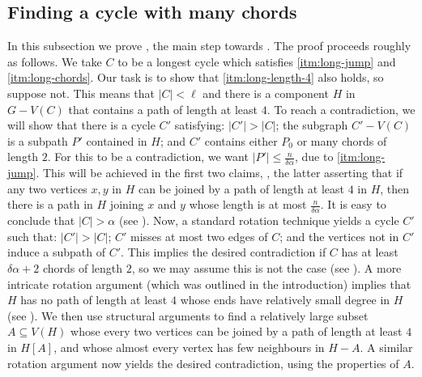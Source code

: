 \documentclass[11pt,english]{article}
\theoremstyle{plain}
\theoremstyle{definition}
\theoremstyle{remark}
\renewcommand{\setminus}{-}
\begin{document}
	\subsection{Finding a cycle with many chords}
		In this subsection we prove , the main step towards . 
		The proof proceeds roughly as follows. We take $C$ to be a longest cycle which satisfies \ref{itm:long-jump} and \ref{itm:long-chords}. Our task is to show that \ref{itm:long-length-4} also holds, so suppose not. This means that $|C| < \ell$ and there is a component $H$ in $G - V(C)$ that contains a path of length at least $4$. To reach a contradiction, we will show that there is a cycle $C'$ satisfying: $|C'| > |C|$; the subgraph $C' \setminus V(C)$ is a subpath $P'$ contained in $H$; and $C'$ contains either $P_0$ or many chords of length $2$. For this to be a contradiction, we want $|P'| \le \frac{n}{\delta \alpha}$, due to \ref{itm:long-jump}. This will be achieved in the first two claims, , the latter asserting that if any two vertices $x,y$ in $H$ can be joined by a path of length at least $4$ in $H$, then there is a path in $H$ joining $x$ and $y$ whose length is at most $\frac{n}{\delta \alpha}$. It is easy to conclude that $|C| > \alpha$ (see ). Now, a standard rotation technique yields a cycle $C'$ such that: $|C'| > |C|$; $C'$ misses at most two edges of $C$; and the vertices not in $C'$ induce a subpath of $C'$. This implies the desired contradiction if $C$ has at least $\delta \alpha + 2$ chords of length $2$, so we may assume this is not the case (see ). A more intricate rotation argument (which was outlined in the introduction) implies that $H$ has no path of length at least $4$ whose ends have relatively small degree in $H$ (see ). 
		We then use structural arguments to find a relatively large subset $A \subseteq V(H)$ whose every two vertices can be joined by a path of length at least $4$ in $H[A]$, and whose almost every vertex has few neighbours in $H - A$. A similar rotation argument now yields the desired contradiction, using the properties of $A$.
\end{document}
